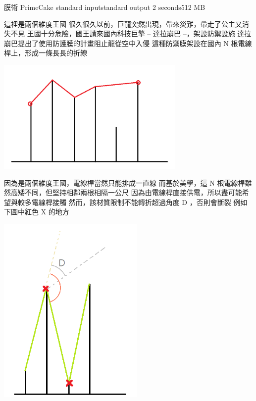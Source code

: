 \gdef\thisproblemauthor{}
\gdef\thisproblemdeveloper{}
\gdef\thisproblemorigin{}
\begin{problem}{膜術 PrimeCake}
{standard input}{standard output}
{2 seconds}{512 MB}{}

這裡是兩個維度王國\newline
很久很久以前，巨龍突然出現，帶來災難，帶走了公主又消失不見\newline
王國十分危險，國王請來國內科技巨擎 -- 達拉崩巴 --，架設防禦設施\newline
達拉崩巴提出了使用防護膜的計畫阻止龍從空中入侵\newline
這種防禦膜架設在國內 N 根電線桿上，形成一條長長的折線\newline

\centerline{\includegraphics[height=15em]{./pics/D-1.png}}

因為是兩個維度王國，電線桿當然只能排成一直線\newline
而基於美學，這 N 根電線桿雖然高矮不同，但堅持相鄰兩根相隔一公尺\newline
\newline
因為由電線桿直接供電，所以盡可能希望與較多電線桿接觸\newline
\newline
然而，該材質限制不能轉折超過角度 D ，否則會斷裂\newline
例如下圖中紅色 X 的地方\newline

\centerline{\includegraphics[height=25em]{./pics/D-2.png}}


\end{problem}

